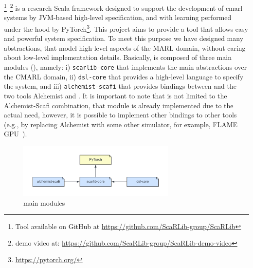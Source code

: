 \section{\scarlib{}}\label{contribution}

\scarlib{} \footnote{Tool available on GitHub at \url{https://github.com/ScaRLib-group/ScaRLib}}~\footnote{demo video at: \url{https://github.com/ScaRLib-group/ScaRLib-demo-video}} is a research Scala framework designed to support
the development of \ac{cmarl} systems by JVM-based high-level specification, and with learning performed under the hood by PyTorch\footnote{\url{https://pytorch.org/}}.
%
This project aims to provide a tool that allows easy and powerful system specification.
%
To meet this purpose we have designed many abstractions, that model high-level aspects of the MARL domain, 
 without caring about low-level implementation details.
Basically, \scarlib{} is composed of three main modules (), namely: 
    i) \texttt{scarlib-core} that implements the main abstractions over the CMARL domain,
    ii) \texttt{dsl-core} that provides a high-level language to specify the system, and
    iii) \texttt{alchemist-scafi} that provides bindings between \scarlib{} and the two tools Alchemist and \scafi{}.
    It is important to note that \scarlib{} is not limited to the Alchemist-Scafi combination, that module is 
    already implemented due to the actual need, however, it is possible to implement other bindings to other tools
    (e.g., by replacing Alchemist with some other simulator, for example, FLAME GPU~\cite{flame}).
\begin{figure}[t]
    \centering
    \includegraphics[width=0.7\textwidth]{papers/coordination2023/imgs/scarlib-modules.pdf}
    \caption{\scarlib{} main modules}
    \label{fig:modules}
\end{figure}

